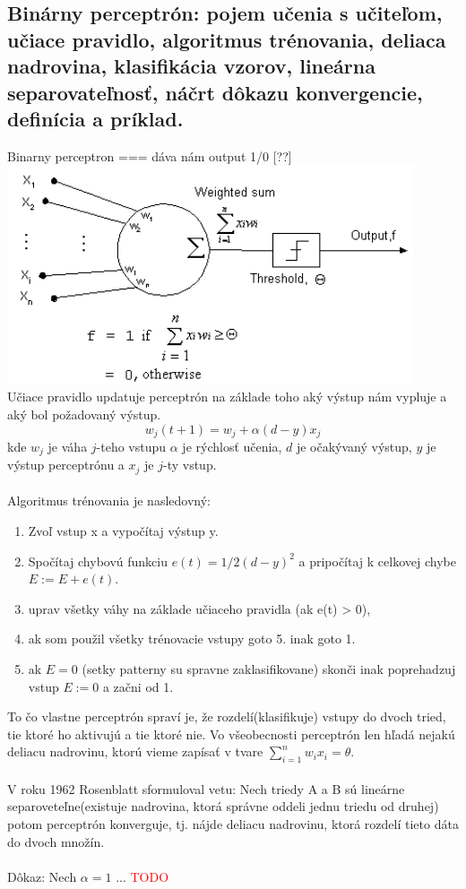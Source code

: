 \documentclass{article}
\numberwithin{equation}{section} %
\begin{document}
\subsection{Binárny perceptrón: pojem učenia s učiteľom, učiace pravidlo, algoritmus trénovania, deliaca nadrovina, klasifikácia vzorov, lineárna separovateľnosť, náčrt dôkazu konvergencie, definícia a príklad.}
Binarny perceptron === dáva nám output 1/0 [??]\\
\includegraphics[width=12cm]{imgs/threshold_neuron}\\
Učiace pravidlo updatuje perceptrón na základe toho aký výstup nám vypluje a aký bol požadovaný výstup. 
$$ w_j(t+1) = w_j + \alpha (d-y)x_j $$
kde $w_j$ je váha $j$-teho vstupu $\alpha$ je rýchlosť učenia, $d$ je očakývaný výstup, $y$ je výstup perceptrónu a $x_j$ je $j$-ty vstup.
\\\\
Algoritmus trénovania je nasledovný:
\begin{enumerate}
\item Zvoľ vstup x a vypočítaj výstup y.
\item Spočítaj chybovú funkciu $e(t) = 1/2(d-y)^2$ a pripočítaj k celkovej chybe $E := E + e(t)$.
\item uprav všetky váhy na základe učiaceho pravidla (ak e(t) > 0),
\item ak som použil všetky trénovacie vstupy goto 5. inak goto 1.
\item ak $E = 0$ (setky patterny su spravne zaklasifikovane) skonči inak poprehadzuj vstup $ E := 0 $ a začni od 1.
\end{enumerate}
To čo vlastne perceptrón spraví je, že rozdelí(klasifikuje) vstupy do dvoch tried, tie ktoré ho aktivujú a tie ktoré nie. Vo všeobecnosti perceptrón len hľadá nejakú deliacu nadrovinu, ktorú vieme zapísať v tvare $\sum_{i=1}^n w_ix_i = \theta$.
\\\\
V roku 1962 Rosenblatt sformuloval vetu: Nech triedy A a B sú lineárne separoveteľne(existuje nadrovina, ktorá správne oddeli jednu triedu od druhej) potom perceptrón konverguje, tj. nájde deliacu nadrovinu, ktorá rozdelí tieto dáta do dvoch množín.
\\\\
Dôkaz: Nech $\alpha = 1$ ... \textcolor{red}{TODO}
\end{document}
